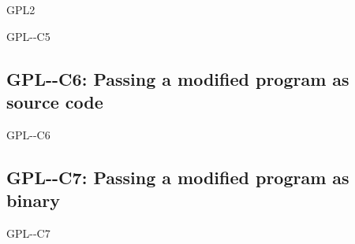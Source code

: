 \begin{license}{GPL2}
\begin{lsuc}{GPL-\ver-C5}
  \useCaseFive{\ver}
  \coversFive

  \begin{lsucrequires}
    \lsucmandatory{\keepLicenseElements}
    \lsucmandatory{\gpltwoEnsureCopyrightNoticeBinary}
    \lsucmandatory{\giveLicense}\passingFilesCorrectly
    \lsucmandatory{\makeAllSourcesAvailable}
    \lsucmandatory{\describeHowToGetSource}
    \lsucmandatory{\addToCopyrightDialogLib}
    \lsucmandatory{\arrangeEnclosingBinaries}
    \lsucmandatory{\retainCopyrightNotices}
    \lsucoptional{\addToDocumentation}
  \end{lsucrequires}

  \lsucprohibitsnothing
\end{lsuc}

\subsection{GPL-\ver-C6: Passing a modified program as source code}
\begin{lsuc}{GPL-\ver-C6}

  \useCaseSix{\ver}
  \coversSix

  \begin{lsucrequires}
    \lsucmandatory{\keepLicenseElements}
    \lsucmandatory{\gpltwoEnsureCopyrightNoticeSource}
    \lsucmandatory{\giveLicense}\passingFilesCorrectly
    \lsucmandatory{\retainCopyrightNotices}
    \lsucmandatory{\addToCopyrightDialogApp}
    \lsucmandatory{\markProgramModifications}
    \lsucmandatory{\arrangeProgramChanges}\howToApplyTheseTerms
    \lsucoptional{\createChangelog}
    \lsucoptional{\addToDocumentation}
  \end{lsucrequires}

  \lsucprohibitsnothing
\end{lsuc}

\subsection{GPL-\ver-C7: Passing a modified program as binary}
\begin{lsuc}{GPL-\ver-C7}

  \useCaseSeven{\ver}
  \coversSeven

  \begin{lsucrequires}
    \lsucmandatory{\keepLicenseElements}
    \lsucmandatory{\gpltwoEnsureCopyrightNoticeBinary}
    \lsucmandatory{\giveLicense}\passingFilesCorrectly
    \lsucmandatory{\retainCopyrightNotices}
    \lsucmandatory{\markProgramModifications}
    \lsucmandatory{\addToCopyrightDialogApp}
    \lsucmandatory{\arrangeProgramChanges}\howToApplyTheseTerms
    \lsucmandatory{\makeModifiedSourceAvailable}
    \lsucmandatory{\describeHowToGetSource}
    \lsucoptional{\createChangelog}
    \lsucoptional{\addToDocumentation}
  \end{lsucrequires}


\end{lsuc}
\end{license}
